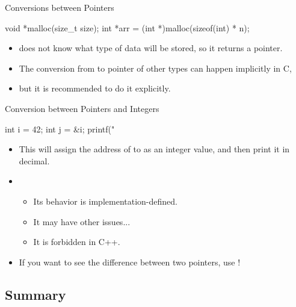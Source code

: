 \documentclass[handout]{beamer}
\begin{document}
\begin{frame}[fragile]{Conversions between Pointers}
    \begin{cpp}
void *malloc(size_t size);
int *arr = (int *)malloc(sizeof(int) * n);
    \end{cpp}
    \begin{itemize}
        \item {} does not know what type of data will be stored, so it returns a \ttt{*} pointer.
        \item The conversion from \ttt{*} to pointer of other types can happen implicitly in C,
        \item but it is recommended to do it explicitly.
    \end{itemize}
\end{frame}

\begin{frame}[fragile]{Conversion between Pointers and Integers}
    \begin{cpp}
int i = 42;
int j = &i;
printf("%
    \end{cpp}
    \begin{itemize}
        \item This will assign the address of  to  as an integer value, and then print it in decimal.
        \pause
        \item {}
        \begin{itemize}
            \item Its behavior is implementation-defined.
            \item It may have other issues...
            \item It is forbidden in C++.
        \end{itemize}
        \pause
        \item If you want to see the difference between two pointers, use !
    \end{itemize}
\end{frame}

\subsection{Summary}
\end{document}
